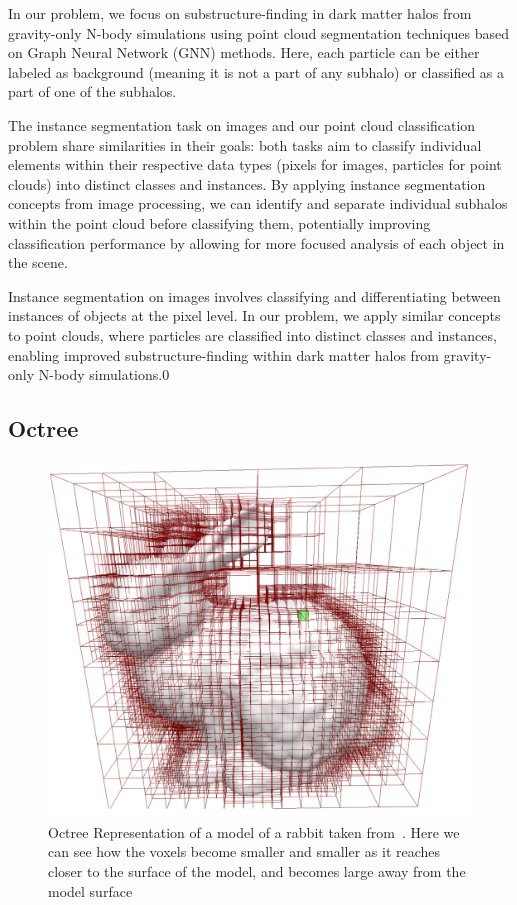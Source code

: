     In our problem, we focus on substructure-finding in dark matter halos from gravity-only N-body simulations using point cloud segmentation techniques based on Graph Neural Network (GNN) methods. Here, each particle can be either labeled as background (meaning it is not a part of any subhalo) or classified as a part of one of the subhalos.

    The instance segmentation task on images and our point cloud classification problem share similarities in their goals: both tasks aim to classify individual elements within their respective data types (pixels for images, particles for point clouds) into distinct classes and instances. By applying instance segmentation concepts from image processing, we can identify and separate individual subhalos within the point cloud before classifying them, potentially improving classification performance by allowing for more focused analysis of each object in the scene.

    Instance segmentation on images involves classifying and differentiating between instances of objects at the pixel level. In our problem, we apply similar concepts to point clouds, where particles are classified into distinct classes and instances, enabling improved substructure-finding within dark matter halos from gravity-only N-body simulations.0


\subsection{Octree}\label{ssec:octree}


    \begin{figure}
        \centering
        \includegraphics[width=0.75\linewidth]{images/octree.png}
        \caption{Octree Representation of a model of a rabbit taken from~\cite{octree}. Here we can see how the voxels become smaller and smaller as it reaches closer to the surface of the model, and becomes large away from the model surface}
        \label{fig:octree}
    \end{figure}


